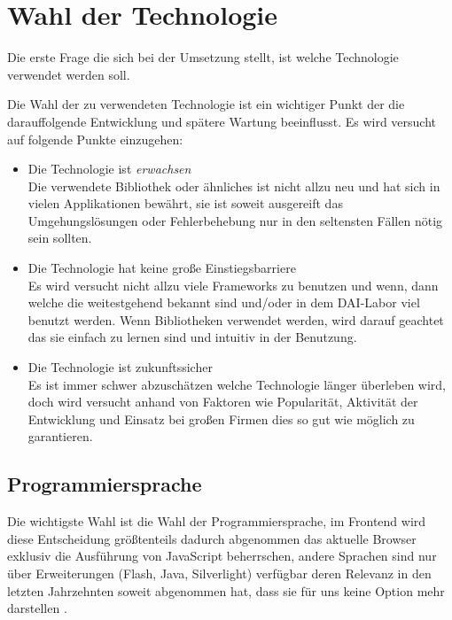 \documentclass[12pt,twoside]{book}
\begin{document}
\section{Wahl der Technologie}

Die erste Frage die sich bei der Umsetzung stellt, ist welche Technologie verwendet werden soll.

Die Wahl der zu verwendeten Technologie ist ein wichtiger Punkt der die darauffolgende Entwicklung und spätere Wartung beeinflusst. Es wird versucht auf folgende Punkte einzugehen:

\begin{itemize}
  \item Die Technologie ist \textit{erwachsen} \\
  Die verwendete Bibliothek oder ähnliches ist nicht allzu neu und hat sich in vielen Applikationen bewährt, sie ist soweit ausgereift das Umgehungslösungen oder Fehlerbehebung nur in den seltensten Fällen nötig sein sollten.
  \item Die Technologie hat keine große Einstiegsbarriere \\
  Es wird versucht nicht allzu viele Frameworks zu benutzen und wenn, dann welche die weitestgehend bekannt sind und/oder in dem DAI-Labor viel benutzt werden. Wenn Bibliotheken verwendet werden, wird darauf geachtet das sie einfach zu lernen sind und intuitiv in der Benutzung.
  \item Die Technologie ist zukunftssicher \\
  Es ist immer schwer abzuschätzen welche Technologie länger überleben wird, doch wird versucht anhand von Faktoren wie Popularität, Aktivität der Entwicklung und Einsatz bei großen Firmen dies so gut wie möglich zu garantieren.
\end{itemize}

\subsection{Programmiersprache}

Die wichtigste Wahl ist die Wahl der Programmiersprache, im Frontend wird diese Entscheidung größtenteils dadurch abgenommen das aktuelle Browser exklusiv die Ausführung von JavaScript beherrschen, andere Sprachen sind nur über Erweiterungen (Flash, Java, Silverlight) verfügbar deren Relevanz in den letzten Jahrzehnten soweit abgenommen hat, dass sie für uns keine Option mehr darstellen \cite{clientside}.
\end{document}
